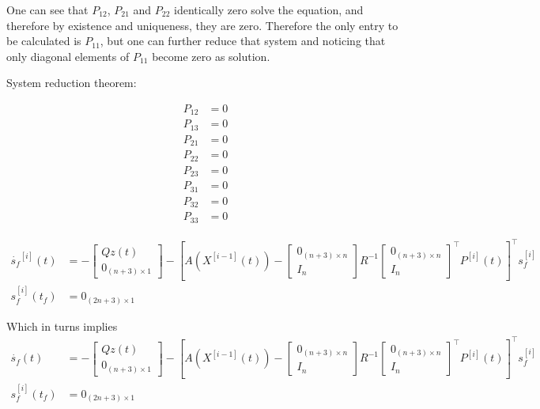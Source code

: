 \documentclass[3p,times]{article}
\begin{document}
One can see that $P_{12}$, $P_{21}$ and $P_{22}$ identically zero solve the equation, and therefore by existence and uniqueness, they are zero. Therefore the only entry to be calculated is $P_{11}$, but one can further reduce that system and noticing that only diagonal elements of $P_{11}$ become zero as solution.

System reduction theorem:

\begin{align}
P_{12} &= 0\\
P_{13} &= 0\\
P_{21} &= 0\\
P_{22} &= 0\\
P_{23} &= 0\\
P_{31} &= 0\\
P_{32} &= 0\\
P_{33} &= 0
\end{align}

\begin{align}
\dot{s_f}^{[i]}(t) &= -\begin{bmatrix}Qz(t) \\ 0_{(n+3)\times 1} \end{bmatrix}- \left[A\left(X^{[i-1]}(t)\right) -\begin{bmatrix} 
0_{(n+3)\times n} \\
I_n
\end{bmatrix}R^{-1}\begin{bmatrix} 
0_{(n+3)\times n} \\
I_n
\end{bmatrix}^{\top}   P^{[i]}(t) \right]^\top s_f^{[i]} \\
s_f^{[i]}(t_f) &=   0_{(2n+3) \times 1}
\end{align}

Which in turns implies
\begin{align}
\dot{s_f}(t) &= -\begin{bmatrix}Qz(t) \\ 0_{(n+3)\times 1} \end{bmatrix}- \left[A\left(X^{[i-1]}(t)\right) -\begin{bmatrix} 
0_{(n+3)\times n} \\
I_n
\end{bmatrix}R^{-1}\begin{bmatrix} 
0_{(n+3)\times n} \\
I_n
\end{bmatrix}^{\top}   P^{[i]}(t) \right]^\top s_f^{[i]} \\
s_f^{[i]}(t_f) &=   0_{(2n+3) \times 1}
\end{align}
\end{document}
